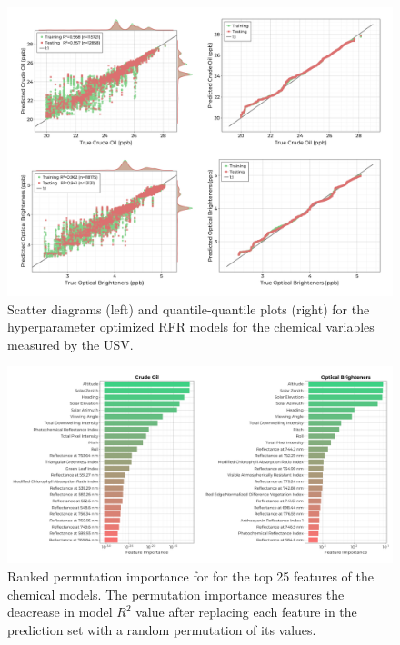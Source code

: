 \documentclass[remotesensing,article,submit,pdftex,moreauthors]{Definitions/mdpi}
\begin{document}
\begin{figure}[t!]
\centering
\vspace{-0.3in}
\includegraphics[width=\columnwidth]{paper/figures/results/fits/chemical-fitres.png}
\vspace{-0.25in}
\caption{Scatter diagrams (left) and quantile-quantile plots (right) for the hyperparameter optimized RFR models for the chemical variables measured by the USV.\label{fig:chemicals-fit}}
\end{figure}  

\begin{figure}[t!]
\centering
\vspace{-0.25in}
\includegraphics[width=\columnwidth]{paper/figures/results/fits/chemical-ranking.pdf}
\vspace{-0.25in}
\caption{Ranked permutation importance for for the top 25 features of the chemical models. The permutation importance measures the deacrease in model $R^2$ value after replacing each feature in the prediction set with a random permutation of its values.\label{fig:chemicals-fi}}
\end{figure}  
\end{document}
